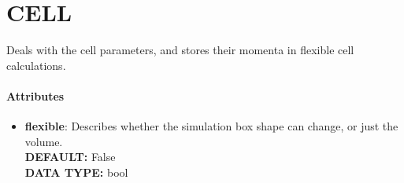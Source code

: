 \section{CELL}
\label{CELL}
Deals with the cell parameters, and stores their momenta in flexible cell calculations.
\paragraph{Attributes}
 \begin{itemize}
\item {\bf flexible}:
 Describes whether the simulation box shape can change, or just the volume.
{\\ \bf DEFAULT: }False
{\\ \bf DATA TYPE: }bool
\end{itemize}
 
